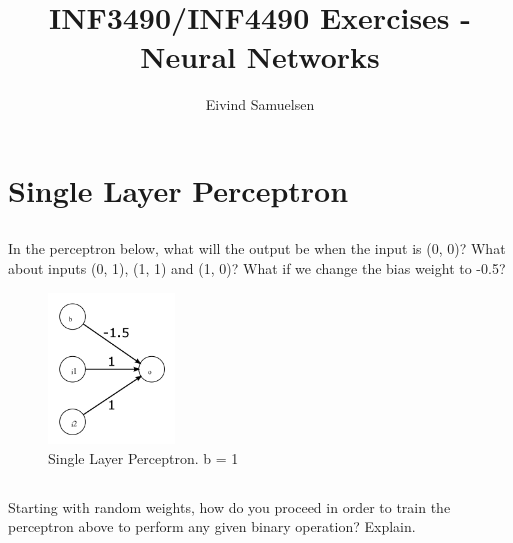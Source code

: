 
\title{\vspace{-2cm}INF3490/INF4490 Exercises - Neural Networks}
\author{Eivind Samuelsen}
\date{}

\setlength\parindent{0pt}


    \renewcommand\marginsymbol[1][0pt]{%
  \tabto*{0cm}\makebox[-1cm][c]{$\mathbb{P}$}\tabto*{\TabPrevPos}}

\maketitle


\section{Single Layer Perceptron}
\subsection{}
In the perceptron below, what will the output be when the input is (0, 0)?
What about inputs (0, 1), (1, 1) and (1, 0)?
What if we change the bias weight to -0.5?

\begin{figure}[H]
\begin{center}
\includegraphics[width=0.3\textwidth]{fig1.png}
\caption{Single Layer Perceptron. b = 1 }
\label{fig:slp}
\end{center}
\end{figure}

\subsection{}
Starting with random weights, how do you proceed in order to train the perceptron above to perform any given binary operation?
Explain.
